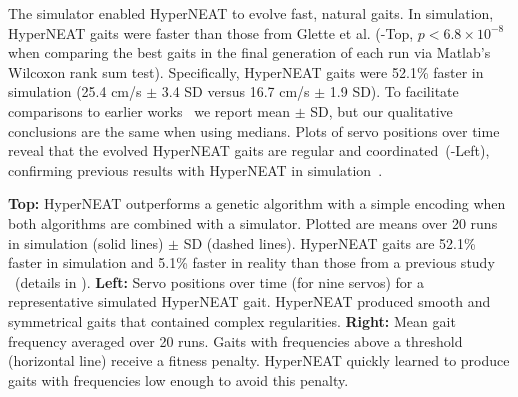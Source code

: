 

The simulator enabled HyperNEAT to evolve fast, natural gaits. In
simulation, HyperNEAT gaits were faster than those from Glette et al. (-Top, $p <
6.8\times10^{-8}$ when comparing the best gaits in the final
generation of each run via Matlab's Wilcoxon rank sum test).
Specifically, HyperNEAT gaits were 52.1\% faster in simulation (25.4
cm/s $\pm$ 3.4 SD versus 16.7 cm/s $\pm$ 1.9 SD). To facilitate comparisons to earlier works~\cite{yos:clune,glette} we report 
mean $\pm$ SD, but our qualitative conclusions are the same when using medians.
Plots of servo positions over time reveal that the evolved HyperNEAT gaits are regular and coordinated~(-Left), confirming previous results with HyperNEAT in simulation~\cite{clune2011performance,clune2009evolving}.

{
\textbf{Top: }
HyperNEAT outperforms a genetic algorithm with a simple encoding \cite{glette} when both algorithms are combined with a simulator. Plotted are means over 20 runs in simulation (solid lines) $\pm$ SD (dashed lines). HyperNEAT gaits are 52.1\% faster in
simulation and 5.1\% faster in reality than those from a previous study \cite{glette}~(details in ).
\textbf{Left: }
Servo positions over time (for nine servos) for a representative simulated HyperNEAT gait. HyperNEAT produced smooth and symmetrical gaits that contained complex regularities. 
\textbf{Right: }Mean gait frequency averaged over 20 runs. 
Gaits with frequencies above a threshold (horizontal line) receive a fitness penalty. HyperNEAT quickly learned to produce gaits with frequencies low enough to avoid this penalty.
}


